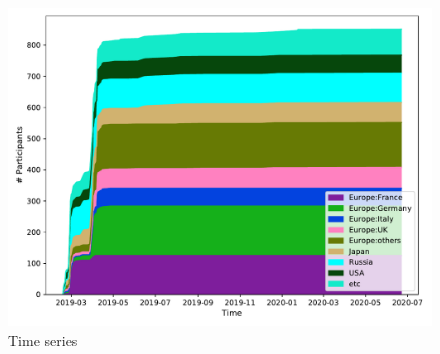 



\begin{figure}[htb]
\begin{center}
\includegraphics{../pdfs/TimeSeries.pdf}
\caption{Time series}
\label{fig:timeseries}
\end{center}
\end{figure}

